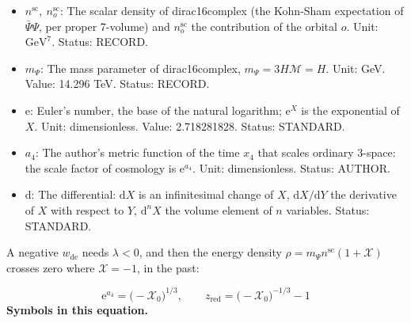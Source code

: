 \documentclass[
  10pt,
]{article}
\begin{document}
\begin{itemize}
  \(\lambda\): The contact self-coupling of dirac16complex (the term
  \(-\frac{\lambda}{2}(\bar\Psi\Psi)^2\) of the record). Unit:
  \(\mathrm{GeV}^{-6}\). Value: not fixed; Kohn-Sham states computed for
  \(\lambda = 0\) and \(\pm7\times10^{-5}H^{-6}\); the fold-band
  radiation requires
  \(\lvert\lambda\rvert \lesssim 1.4\times10^{-10}H^{-6}\) (for
  \(\Delta N_{\mathrm{eff}} \le 0.001\)). Status: RECORD.
\item
  \(n^{\mathrm{sc}},\ n^{\mathrm{sc}}_o\): The scalar density of
  dirac16complex (the Kohn-Sham expectation of \(\bar\Psi\Psi\), per
  proper 7-volume) and \(n^{\mathrm{sc}}_o\) the contribution of the
  orbital \(o\). Unit: \(\mathrm{GeV}^{7}\). Status: RECORD.
\item
  \(m_\Psi\): The mass parameter of dirac16complex,
  \(m_\Psi = 3H\mathcal{M} = H\). Unit: GeV. Value: 14.296 TeV. Status:
  RECORD.
\item
  \(\mathrm{e}\): Euler's number, the base of the natural logarithm;
  \(\mathrm{e}^{X}\) is the exponential of \(X\). Unit: dimensionless.
  Value: 2.718281828. Status: STANDARD.
\item
  \(a_4\): The author's metric function of the time \(x_4\) that scales
  ordinary 3-space: the scale factor of cosmology is
  \(\mathrm{e}^{a_4}\). Unit: dimensionless. Status: AUTHOR.
\item
  \(\mathrm{d}\): The differential: \(\mathrm{d}X\) is an infinitesimal
  change of \(X\), \(\mathrm{d}X/\mathrm{d}Y\) the derivative of \(X\)
  with respect to \(Y\), \(\mathrm{d}^nX\) the volume element of \(n\)
  variables. Status: STANDARD.
\end{itemize}

A negative \(w_{\mathrm{de}}\) needs \(\lambda < 0\), and then the
energy density \(\rho = m_\Psi n^{\mathrm{sc}}(1 + \mathcal{X})\)
crosses zero where \(\mathcal{X} = -1\), in the past:

\[ \mathrm{e}^{a_4} = \big(-\mathcal{X}_0\big)^{1/3},\qquad z_{\mathrm{red}} = \big(-\mathcal{X}_0\big)^{-1/3} - 1 \]
\textbf{Symbols in this equation.}
\end{document}
